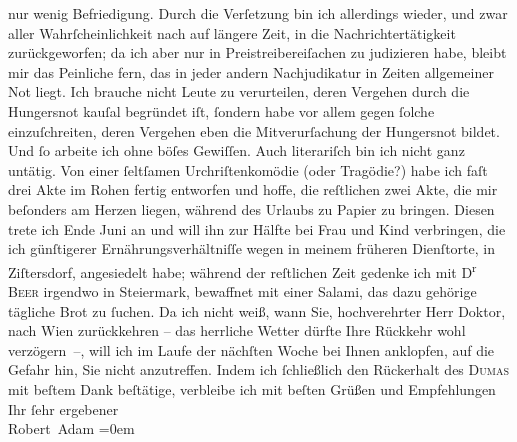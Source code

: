 \begin{ledgroupsized}[t]{13cm}
               nur wenig Befriedigung.\pend
           \pstart
           Durch die Verſetzung bin ich allerdings wieder, und zwar aller Wahrſcheinlichkeit
               nach auf längere Zeit, in die Nachrichtertätigkeit zurückgeworfen; da ich aber nur in
               Preistreibereiſachen zu judizieren habe, bleibt mir das Peinliche fern, das in jeder
               andern Nachjudikatur in Zeiten allgemeiner Not liegt. Ich brauche nicht Leute zu
               verurteilen, deren Vergehen durch die Hungersnot kauſal begründet iſt, ſondern habe
               vor allem gegen ſolche einzuſchreiten, deren Vergehen {\pb}eben die Mitverurſachung der Hungersnot bildet. Und ſo arbeite ich ohne böſes
               Gewiſſen.\pend
           \pstart
           Auch literariſch bin ich nicht ganz untätig. Von einer ſeltſamen Urchriſtenkomödie (oder Tragödie?) habe ich
               faſt drei Akte im Rohen fertig entworfen und hoffe, die reſtlichen zwei Akte, die mir
               beſonders am Herzen liegen, während des Urlaubs zu Papier zu bringen. Diesen trete
               ich Ende Juni an und will ihn zur Hälfte bei Frau und Kind verbringen, die ich günſtigerer Ernährungsverhältniſſe
               wegen in meinem früheren Dienſtorte, in Ziſtersdorf, angesiedelt habe; während der reſtlichen Zeit gedenke ich mit
                  D\textsuperscript{r}{ }\textsc{Beer} irgendwo in Steiermark, bewaffnet mit einer
               Salami, das dazu gehörige tägliche {\pb}Brot zu
               ſuchen.\pend
           \pstart
           Da ich nicht weiß, wann Sie, hochverehrter Herr Doktor, nach Wien zurückkehren – das herrliche Wetter dürfte Ihre Rückkehr
               wohl verzögern –, will ich im Laufe der nächſten Woche bei Ihnen anklopfen, auf die
               Gefahr hin, Sie nicht anzutreffen.\pend
           \pstart
           Indem ich ſchließlich den Rückerhalt des \textsc{Dumas} mit beſtem Dank beſtätige, verbleibe ich mit beſten Grüßen und Empfehlungen
               Ihr\pend
           \pstart
           ſehr ergebener{\\[\baselineskip]}\spacefill\mbox{Robert Adam}\pend
           \leftskip=0em{}
         

\end{ledgroupsized}
